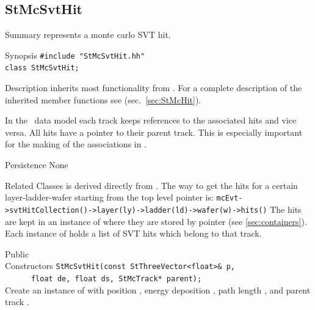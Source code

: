 \subsection{StMcSvtHit}
 
\label{sec:StMcSvtHit}
\begin{Entry}
\item[Summary]
     represents a monte carlo SVT hit.

\item[Synopsis]
    \verb+#include "StMcSvtHit.hh"+\\
    \verb+class StMcSvtHit;+\\

\item[Description]    
     inherits most functionality from .
    For a complete description of the inherited member functions see
     (sec.~\ref{sec:StMcHit}).

    In the \StMcEvent\ data model each track keeps references to the
    associated hits and vice versa. All hits have a pointer to their
    parent track.  This is especially important for the making of the
    associations in \StAssociationMaker. 
    
    
    
\item[Persistence]
    None

\item[Related Classes]
     is derived directly from .
    The way to get the hits for a
    certain layer-ladder-wafer starting
    from the top level  pointer is:
    \verb+mcEvt->svtHitCollection()->layer(ly)->ladder(ld)->wafer(w)->hits()+
    The hits are kept in an instance of 
    where they are stored by pointer (see \ref{sec:containers}).
    Each instance of  holds a list of SVT hits
    which belong to that track.

\item[Public\\ Constructors]
    \verb+StMcSvtHit(const StThreeVector<float>& p,+\\
    \verb+      float de, float ds, StMcTrack* parent);+\\
    
    Create an instance of  with position ,
    energy deposition , path length , and parent track .


\end{Entry}
